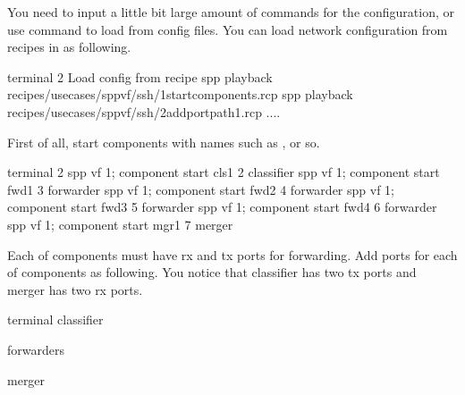 \documentclass[a4paper,11pt,openany,oneside,english]{sphinxmanual}
\begin{document}
You need to input a little bit large amount of commands for the
configuration, or use  command to load from config files.
You can load network configuration  from recipes in 
as following.

\begin{sphinxVerbatim}[commandchars=\\\{\},formatcom=\footnotesize]
\PYGZsh{} terminal 2
\PYGZsh{} Load config from recipe
spp \PYGZgt{} playback recipes/usecases/spp\PYGZus{}vf/ssh/1\PYGZhy{}start\PYGZus{}components.rcp
spp \PYGZgt{} playback recipes/usecases/spp\PYGZus{}vf/ssh/2\PYGZhy{}add\PYGZus{}port\PYGZus{}path1.rcp
....
\end{sphinxVerbatim}

First of all, start components with names such as ,  or so.

\begin{sphinxVerbatim}[commandchars=\\\{\},formatcom=\footnotesize]
\PYGZsh{} terminal 2
spp \PYGZgt{} vf 1; component start cls1 2 classifier
spp \PYGZgt{} vf 1; component start fwd1 3 forwarder
spp \PYGZgt{} vf 1; component start fwd2 4 forwarder
spp \PYGZgt{} vf 1; component start fwd3 5 forwarder
spp \PYGZgt{} vf 1; component start fwd4 6 forwarder
spp \PYGZgt{} vf 1; component start mgr1 7 merger
\end{sphinxVerbatim}

Each of components must have rx and tx ports for forwarding.
Add ports for each of components as following.
You notice that classifier has two tx ports and merger has two rx ports.

\begin{sphinxVerbatim}[commandchars=\\\{\},formatcom=\footnotesize]
 terminal 
 classifier

 forwarders

 merger
\end{sphinxVerbatim}
\end{document}
